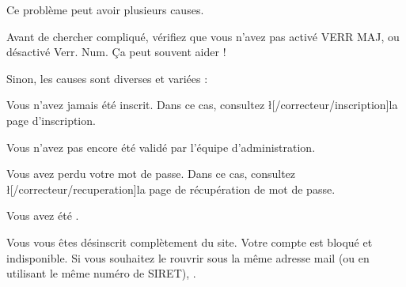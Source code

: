 Ce problème peut avoir plusieurs causes.

Avant de chercher compliqué, vérifiez que vous n'avez pas activé VERR MAJ, ou désactivé Verr. Num. Ça peut souvent aider !

Sinon, les causes sont diverses et variées :
\item Vous n'avez jamais été inscrit. Dans ce cas, consultez \l[/correcteur/inscription]{la page d'inscription}.
\item Vous n'avez pas encore été validé par l'équipe d'administration.
\item Vous avez perdu votre mot de passe. Dans ce cas, consultez \l[/correcteur/recuperation]{la page de récupération de mot de passe}.
\item Vous avez été .
\item Vous vous êtes désinscrit complètement du site. Votre compte est bloqué et indisponible. Si vous souhaitez le rouvrir sous la même adresse mail (ou en utilisant le même numéro de SIRET), .
